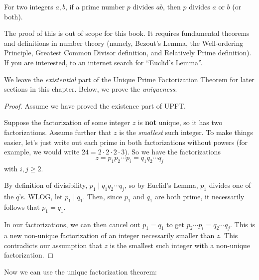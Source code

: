 \documentclass[main.tex]{subfiles}
\begin{document}
\begin{prop}
	For two integers \(a,b\), if a prime number \(p\) divides \(ab\), then \(p\) divides \(a\) or \(b\) (or both).
\end{prop}

The proof of this is out of scope for this book. It requires fundamental theorems and definitions in number theory (namely, Bezout's Lemma, the Well-ordering Principle, Greatest Common Divisor definition, and Relatively Prime definition). If you are interested, to an internet search for ``Euclid's Lemma''.

We leave the \textit{existential} part of the Unique Prime Factorization Theorem for later sections in this chapter. Below, we prove the \textit{uniqueness}.

\begin{proof}
	Assume we have proved the existence part of UPFT.
	
	Suppose the factorization of some integer \(z\) is \textbf{not} unique, so it has two factorizations. Assume further that \(z\) is the \textit{smallest} such integer. To make things easier, let's just write out each prime in both factorizations without powers (for example, we would write \(24 = 2 \cdot 2 \cdot 2 \cdot 3\)). So we have the factorizations \[z = p_1 p_2 \cdots p_i = q_1 q_2 \cdots q_j\]
	with \(i,j \geq 2\).
	
	By definition of divisibility, \(p_1 \mid q_1 q_2 \cdots q_j\), so by Euclid's Lemma, \(p_1\) divides one of the \(q\)'s. WLOG, let \(p_1 \mid q_1\). Then, since \(p_1\) and \(q_1\) are both prime, it necessarily follows that \(p_1 = q_1\).
	
	In our factorizations, we can then cancel out \(p_1 = q_1\) to get \(p_2 \cdots p_i = q_2 \cdots q_j\). This is a new non-unique factorization of an integer necessarily smaller than \(z\). This contradicts our assumption that \(z\) is the smallest such integer with a non-unique factorization.
\end{proof}

Now we can use the unique factorization theorem:

\end{document}
